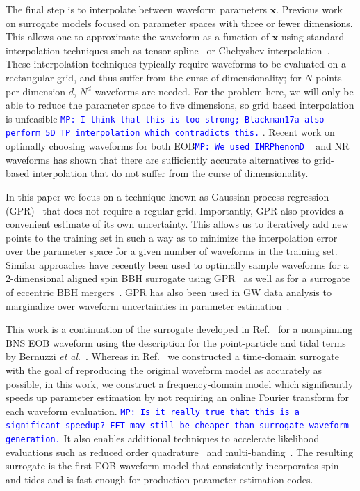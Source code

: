 \documentclass[prd,aps,letter,twocolumn,floatfix,notitlepage,nofootinbib]{revtex4-1}
\def\bx{\mathbf{x}}
\newcommand{\MP}[1]{{\textcolor{blue}{\texttt{MP: #1}} }}
\begin{document}
The final step is to interpolate between waveform parameters $\bx$. Previous work on surrogate models focused on parameter spaces with three or fewer dimensions. This allows one to approximate the waveform as a function of $\bx$ using standard interpolation techniques such as tensor spline~\cite{Puerrer2014, Puerrer2015} or Chebyshev interpolation~\cite{LackeyBernuzziGalley2017}. These interpolation techniques typically require waveforms to be evaluated on a rectangular grid, and thus suffer from the curse of dimensionality; for $N$ points per dimension $d$,  $N^d$ waveforms are needed. For the problem here, we will only be able to reduce the parameter space to five dimensions, so grid based interpolation is unfeasible \MP{I think that this is too strong; Blackman17a also perform 5D TP interpolation which contradicts this.}. Recent work on optimally choosing waveforms for both EOB\MP{We used IMRPhenomD}~\cite{DoctorFarrHolz2017} and NR~\cite{BlackmanFieldScheel2017a, BlackmanFieldScheel2017b} waveforms has shown that there are sufficiently accurate alternatives to grid-based interpolation that do not suffer from the curse of dimensionality.

In this paper we focus on a technique known as Gaussian process regression (GPR)~\cite{RasmussenWilliams2006} that does not require a regular grid. Importantly, GPR also provides a convenient estimate of its own uncertainty. This allows us to iteratively add new points to the training set in such a way as to minimize the interpolation error over the parameter space for a given number of waveforms in the training set. Similar approaches have recently been used to optimally sample waveforms for a 2-dimensional aligned spin BBH surrogate using GPR~\cite{DoctorFarrHolz2017} as well as for a surrogate of eccentric BBH mergers~\cite{HuertaMooreKumar2017}. GPR has also been used in GW data analysis to marginalize over waveform uncertainties in parameter estimation~\cite{MooreGair2014, MooreBerryChua2016}.

This work is a continuation of the surrogate developed in Ref.~\cite{LackeyBernuzziGalley2017} for a nonspinning BNS EOB waveform using the description for the point-particle and tidal terms by Bernuzzi {\it et al}.~\cite{Bernuzzi:2014owa}. Whereas in Ref.~\cite{LackeyBernuzziGalley2017} we constructed a time-domain surrogate with the goal of reproducing the original waveform model as accurately as possible, in this work, we construct a frequency-domain model which significantly speeds up parameter estimation by not requiring an online Fourier transform for each waveform evaluation. \MP{Is it really true that this is a significant speedup? FFT may still be cheaper than surrogate waveform generation.} It also enables additional techniques to accelerate likelihood evaluations such as reduced order quadrature~\cite{Antil2013, CanizaresFieldGair2013, CanizaresFieldGair2015, Smith:2016qas} and multi-banding~\cite{VinciguerraVeitchMandel2017}. The resulting surrogate is the first EOB waveform model that consistently incorporates spin and tides and is fast enough for production parameter estimation codes.
\end{document}
